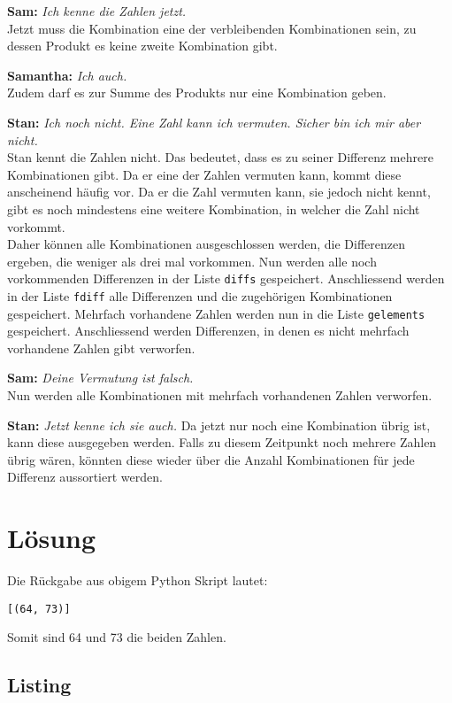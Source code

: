 \documentclass[a4paper, 10pt, fleqn]{article}
\begin{document}
\textbf{Sam: }\emph{Ich kenne die Zahlen jetzt. } \\
Jetzt muss die Kombination eine der verbleibenden Kombinationen sein, zu dessen 
Produkt es keine zweite Kombination gibt. 


\textbf{Samantha: }\emph{Ich auch. } \\
Zudem darf es zur Summe des Produkts nur eine Kombination geben. 


\textbf{Stan: }\emph{Ich noch nicht. Eine Zahl kann ich vermuten. 
Sicher bin ich mir aber nicht.} \\
Stan kennt die Zahlen nicht. Das bedeutet, dass es zu seiner Differenz mehrere 
Kombinationen gibt. Da er eine der Zahlen vermuten kann, kommt diese 
anscheinend häufig vor. Da er die Zahl vermuten kann, sie jedoch nicht kennt, 
gibt es noch mindestens eine weitere Kombination, in welcher die Zahl nicht 
vorkommt. \\
Daher können alle Kombinationen ausgeschlossen werden, die Differenzen ergeben, 
die weniger als drei mal vorkommen. Nun werden alle noch vorkommenden 
Differenzen in der Liste \verb?diffs? gespeichert. Anschliessend werden in der 
Liste \verb?fdiff? alle Differenzen und die zugehörigen Kombinationen 
gespeichert. Mehrfach vorhandene Zahlen werden nun in die Liste 
\verb?gelements? gespeichert. Anschliessend werden Differenzen, in denen es 
nicht mehrfach vorhandene Zahlen gibt verworfen. 


\textbf{Sam: }\emph{Deine Vermutung ist falsch. } \\
Nun werden alle Kombinationen mit mehrfach vorhandenen Zahlen verworfen. 


\textbf{Stan: }\emph{Jetzt kenne ich sie auch. }
Da jetzt nur noch eine Kombination übrig ist, kann diese ausgegeben werden. 
Falls zu diesem Zeitpunkt noch mehrere Zahlen übrig wären, könnten diese wieder 
über die Anzahl Kombinationen für jede Differenz aussortiert werden. 


\section{Lösung}
Die Rückgabe aus obigem Python Skript lautet: 
\begin{lstlisting}
[(64, 73)]
\end{lstlisting}
Somit sind 64 und 73 die beiden Zahlen. 

\clearpage

\begin{appendices}

  \section{Listing}
  

\end{appendices}
\end{document}
